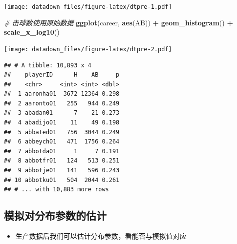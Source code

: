 \documentclass[
]{book}
\newenvironment{Shaded}{\begin{snugshade}}{\end{snugshade}}
\newcommand{\CommentTok}[1]{\textcolor[rgb]{0.56,0.35,0.01}{\textit{#1}}}
\newcommand{\DataTypeTok}[1]{\textcolor[rgb]{0.13,0.29,0.53}{#1}}
\newcommand{\DecValTok}[1]{\textcolor[rgb]{0.00,0.00,0.81}{#1}}
\newcommand{\KeywordTok}[1]{\textcolor[rgb]{0.13,0.29,0.53}{\textbf{#1}}}
\newcommand{\NormalTok}[1]{#1}
\newcommand{\OperatorTok}[1]{\textcolor[rgb]{0.81,0.36,0.00}{\textbf{#1}}}
\newcommand{\StringTok}[1]{\textcolor[rgb]{0.31,0.60,0.02}{#1}}
\providecommand{\tightlist}{%
  \setlength{\itemsep}{0pt}\setlength{\parskip}{0pt}}
\begin{document}
\texttt{[image: datadown\_files/figure-latex/dtpre-1.pdf]}

\begin{Shaded}
\begin{Highlighting}[]
\CommentTok{# 击球数使用原始数据}
\KeywordTok{ggplot}\NormalTok{(career, }\KeywordTok{aes}\NormalTok{(AB)) }\OperatorTok{+}
\StringTok{  }\KeywordTok{geom_histogram}\NormalTok{() }\OperatorTok{+}
\StringTok{  }\KeywordTok{scale_x_log10}\NormalTok{()}
\end{Highlighting}
\end{Shaded}

\texttt{[image: datadown\_files/figure-latex/dtpre-2.pdf]}

\begin{Shaded}
\end{Shaded}

\begin{verbatim}
## # A tibble: 10,893 x 4
##    playerID      H    AB     p
##    <chr>     <int> <int> <dbl>
##  1 aaronha01  3672 12364 0.298
##  2 aaronto01   255   944 0.249
##  3 abadan01      7    21 0.273
##  4 abadijo01    11    49 0.198
##  5 abbated01   756  3044 0.249
##  6 abbeych01   471  1756 0.264
##  7 abbotda01     1     7 0.191
##  8 abbotfr01   124   513 0.251
##  9 abbotje01   141   596 0.243
## 10 abbotku01   504  2044 0.261
## # ... with 10,883 more rows
\end{verbatim}

\hypertarget{ux6a21ux62dfux5bf9ux5206ux5e03ux53c2ux6570ux7684ux4f30ux8ba1}{%
\subsection{模拟对分布参数的估计}\label{ux6a21ux62dfux5bf9ux5206ux5e03ux53c2ux6570ux7684ux4f30ux8ba1}}

\begin{itemize}
\tightlist
\item
  生产数据后我们可以估计分布参数，看能否与模拟值对应
\end{itemize}
\end{document}
